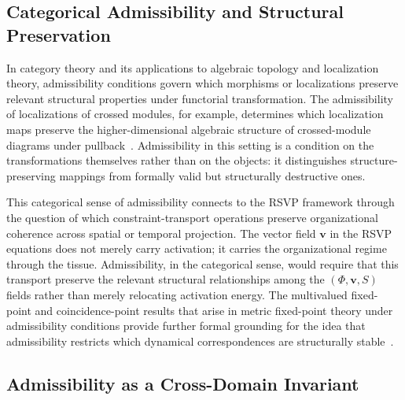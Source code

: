 \documentclass[11pt,a4paper]{article}
\theoremstyle{plain}
\theoremstyle{definition}
\begin{document}
\subsection{Categorical Admissibility and Structural Preservation}

In category theory and its applications to algebraic topology and localization theory,
admissibility conditions govern which morphisms or localizations preserve relevant
structural properties under functorial transformation. The admissibility of localizations
of crossed modules, for example, determines which localization maps preserve the
higher-dimensional algebraic structure of crossed-module diagrams under
pullback~\cite{Monjon2023}. Admissibility in this setting is a condition on the
transformations themselves rather than on the objects: it distinguishes structure-preserving
mappings from formally valid but structurally destructive ones.

This categorical sense of admissibility connects to the RSVP framework through the
question of which constraint-transport operations preserve organizational coherence
across spatial or temporal projection. The vector field $\mathbf{v}$ in the RSVP
equations does not merely carry activation; it carries the organizational regime through
the tissue. Admissibility, in the categorical sense, would require that this transport
preserve the relevant structural relationships among the $(\Phi, \mathbf{v}, S)$
fields rather than merely relocating activation energy. The multivalued fixed-point
and coincidence-point results that arise in metric fixed-point theory under admissibility
conditions provide further formal grounding for the idea that admissibility restricts
which dynamical correspondences are structurally stable~\cite{Choudhury2025}.

\subsection{Admissibility as a Cross-Domain Invariant}
\end{document}
